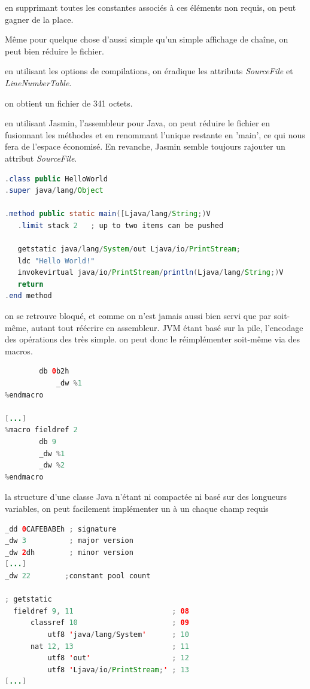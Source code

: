 en supprimant toutes les constantes associés à ces éléments non requis, on peut gagner de la place.

Même pour quelque chose d'aussi simple qu'un simple affichage de chaîne, on peut bien réduire le fichier.

en utilisant les options de compilations, on éradique les attributs {\em SourceFile} et {\em LineNumberTable}.

on obtient un fichier de 341 octets.

en utilisant Jasmin, l'assembleur pour Java, on peut réduire le fichier en fusionnant les méthodes et en renommant l'unique restante en 'main', ce qui nous fera de l'espace économisé. En revanche, Jasmin semble toujours rajouter un attribut {\em SourceFile}.

\begin{lstlisting}[language={java},caption={un Hello World minimal en Jasmin},label={lst:albertini:hwjasmin}]
.class public HelloWorld
.super java/lang/Object

.method public static main([Ljava/lang/String;)V
   .limit stack 2   ; up to two items can be pushed

   getstatic java/lang/System/out Ljava/io/PrintStream;
   ldc "Hello World!"
   invokevirtual java/io/PrintStream/println(Ljava/lang/String;)V
   return
.end method
\end{lstlisting}

on se retrouve bloqué, et comme on n'est jamais aussi bien servi que par soit-même, autant tout réécrire en assembleur.
JVM étant basé sur la pile, l'encodage des opérations des très simple. on peut donc le réimplémenter soit-même via des macros.
\begin{lstlisting}[language={java},caption={un Hello World minimal en Java},label={lst:albertini:asmjavamacros}]
%macro GETSTATIC 1
        db 0b2h
            _dw %1
%endmacro

[...]
%macro fieldref 2
        db 9
        _dw %1
        _dw %2
%endmacro
\end{lstlisting}

la structure d'une classe Java n'étant ni compactée ni basé sur des longueurs variables, on peut facilement implémenter un à un chaque champ requis
\begin{lstlisting}[language={java},caption={un Hello World minimal en Java},label={lst:albertini:asmjavafields}]
_dd 0CAFEBABEh ; signature
_dw 3          ; major version
_dw 2dh        ; minor version
[...]
_dw 22        ;constant pool count

; getstatic
  fieldref 9, 11                       ; 08
      classref 10                      ; 09
          utf8 'java/lang/System'      ; 10
      nat 12, 13                       ; 11
          utf8 'out'                   ; 12
          utf8 'Ljava/io/PrintStream;' ; 13
[...]
\end{lstlisting}

